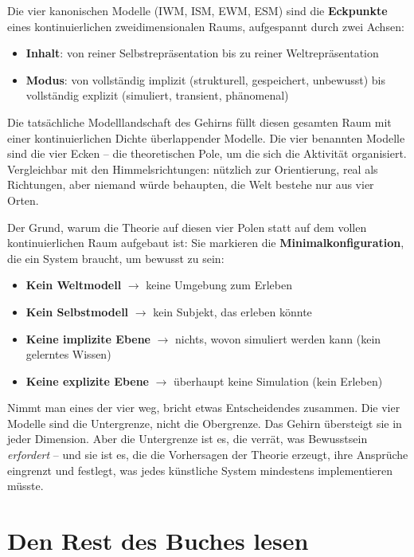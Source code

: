 \documentclass[11pt, twoside, openright]{book}
\begin{document}
Die vier kanonischen Modelle (IWM, ISM, EWM, ESM) sind die \textbf{Eckpunkte} eines kontinuierlichen zweidimensionalen Raums, aufgespannt durch zwei Achsen:

\begin{itemize}
  \item \textbf{Inhalt}: von reiner Selbstrepräsentation bis zu reiner Weltrepräsentation
  \item \textbf{Modus}: von vollständig implizit (strukturell, gespeichert, unbewusst) bis vollständig explizit (simuliert, transient, phänomenal)
\end{itemize}

Die tatsächliche Modelllandschaft des Gehirns füllt diesen gesamten Raum mit einer kontinuierlichen Dichte überlappender Modelle. Die vier benannten Modelle sind die vier Ecken -- die theoretischen Pole, um die sich die Aktivität organisiert. Vergleichbar mit den Himmelsrichtungen: nützlich zur Orientierung, real als Richtungen, aber niemand würde behaupten, die Welt bestehe nur aus vier Orten.

Der Grund, warum die Theorie auf diesen vier Polen statt auf dem vollen kontinuierlichen Raum aufgebaut ist: Sie markieren die \textbf{Minimalkonfiguration}, die ein System braucht, um bewusst zu sein:

\begin{itemize}
  \item \textbf{Kein Weltmodell} $\rightarrow$ keine Umgebung zum Erleben
  \item \textbf{Kein Selbstmodell} $\rightarrow$ kein Subjekt, das erleben könnte
  \item \textbf{Keine implizite Ebene} $\rightarrow$ nichts, wovon simuliert werden kann (kein gelerntes Wissen)
  \item \textbf{Keine explizite Ebene} $\rightarrow$ überhaupt keine Simulation (kein Erleben)
\end{itemize}

Nimmt man eines der vier weg, bricht etwas Entscheidendes zusammen. Die vier Modelle sind die Untergrenze, nicht die Obergrenze. Das Gehirn übersteigt sie in jeder Dimension. Aber die Untergrenze ist es, die verrät, was Bewusstsein \textit{erfordert} -- und sie ist es, die die Vorhersagen der Theorie erzeugt, ihre Ansprüche eingrenzt und festlegt, was jedes künstliche System mindestens implementieren müsste.

\section*{Den Rest des Buches lesen}
\end{document}
